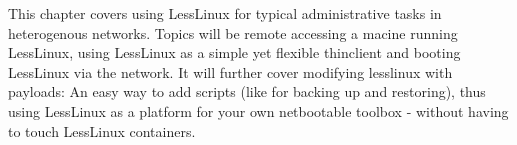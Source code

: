 
This chapter covers using LessLinux for typical administrative tasks in heterogenous networks. Topics will be remote accessing a macine running LessLinux, using LessLinux as a simple yet flexible thinclient and booting LessLinux via the network. It will further cover modifying lesslinux with payloads: An easy way to add scripts (like for backing up and restoring), thus using LessLinux as a platform for your own netbootable toolbox  - without having to touch LessLinux containers.

